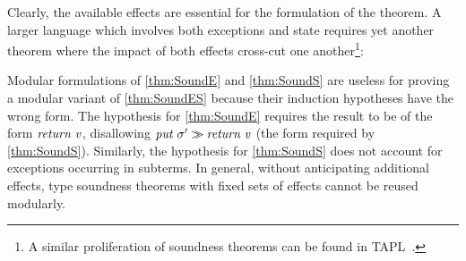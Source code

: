 \vspace{2mm}


Clearly, the available effects are essential for the formulation of
the theorem. A larger language which involves both exceptions and
state requires yet another theorem where the impact of both effects
cross-cut one another\footnote{A similar
proliferation of soundness theorems can be found in
TAPL~\cite{pierce}.}:

\vspace{2mm}
\noindent{}
\vspace{2mm}

Modular formulations of \ref{thm:SoundE} and \ref{thm:SoundS} are
useless for proving a modular variant of \ref{thm:SoundES} because
their induction hypotheses have the wrong form. The hypothesis for
\ref{thm:SoundE} requires the result to be of the form \ensuremath{\Varid{return}\;\Varid{v}},
disallowing \ensuremath{\Varid{put}\;\sigma'\sequ \Varid{return}\;\Varid{v}} (the form required by \ref{thm:SoundS}).
Similarly, the hypothesis for \ref{thm:SoundS} does not
account for exceptions occurring in subterms. In general, without
anticipating additional effects, type soundness theorems with fixed
sets of effects cannot be reused modularly.

